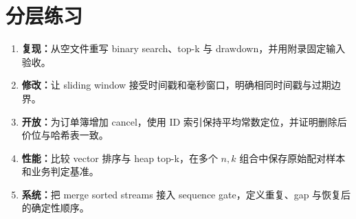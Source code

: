 \section{分层练习}

\begin{enumerate}
  \item \textbf{复现：}从空文件重写 binary search、top-k 与 drawdown，并用附录固定输入验收。
  \item \textbf{修改：}让 sliding window 接受时间戳和毫秒窗口，明确相同时间戳与过期边界。
  \item \textbf{开放：}为订单簿增加 cancel，使用 ID 索引保持平均常数定位，并证明删除后价位与哈希表一致。
  \item \textbf{性能：}比较 vector 排序与 heap top-k，在多个 \(n,k\) 组合中保存原始配对样本和业务判定基准。
  \item \textbf{系统：}把 merge sorted streams 接入 sequence gate，定义重复、gap 与恢复后的确定性顺序。
\end{enumerate}
